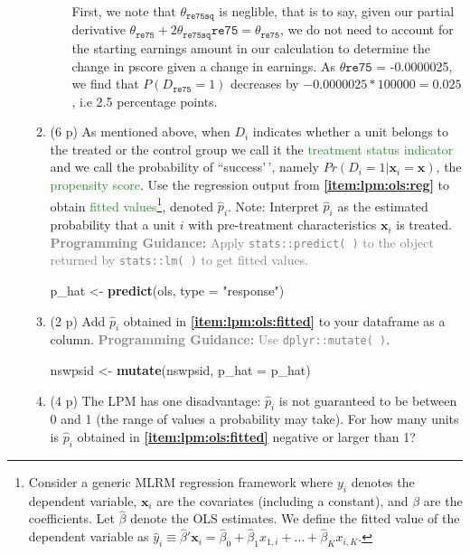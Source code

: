 \documentclass[
]{article}
\newenvironment{Shaded}{\begin{snugshade}}{\end{snugshade}}
\newcommand{\AttributeTok}[1]{\textcolor[rgb]{0.13,0.29,0.53}{#1}}
\newcommand{\FunctionTok}[1]{\textcolor[rgb]{0.13,0.29,0.53}{\textbf{#1}}}
\newcommand{\NormalTok}[1]{#1}
\newcommand{\OtherTok}[1]{\textcolor[rgb]{0.56,0.35,0.01}{#1}}
\newcommand{\StringTok}[1]{\textcolor[rgb]{0.31,0.60,0.02}{#1}}
\begin{document}
\begin{enumerate}
\begin{enumerate}
\begin{enumerate}
      First, we note that \(\theta_{\texttt{re75sq}}\) is neglible, that
      is to say, given our partial derivative
      \(\theta_{\texttt{re75}} + 2\theta_{\texttt{re75sq}}\texttt{re75} = \theta_{\texttt{re75}}\),
      we do not need to account for the starting earnings amount in our
      calculation to determine the change in pscore given a change in
      earnings. As \(\theta{\texttt{re75}}\) = -0.0000025, we find that
      \(P(D_\texttt{re75}=1)\) decreases by
      \(-0.0000025 * 100000 = 0.025\), i.e 2.5 percentage points.
    \end{enumerate}
  \item
    (6 p) As mentioned above, when \(D_i\) indicates whether a unit
    belongs to the treated or the control group we call it the
    \textcolor{ForestGreen}{treatment status indicator} and we call the
    probability of ``success'\,', namely
    \(Pr(D_i=1|\mathbf{x}_i=\mathbf{x})\), the
    \textcolor{ForestGreen}{propensity score}. Use the regression output
    from \textbf{\ref{item:lpm:ols:reg}} to obtain
    \textcolor{ForestGreen}{fitted values}\footnote{Consider a generic MLRM regression framework where $y_i$ denotes the dependent variable, $\mathbf{x}_i$ are the covariates (including a constant), and $\beta$ are the coefficients. Let $\hat{\beta}$ denote the OLS estimates. We define the fitted value of the dependent variable as $\hat{y}_i \equiv \hat{\beta}'\mathbf{x}_i = \hat{\beta}_0 + \hat{\beta}_1 x_{1,i}+\ldots+\hat{\beta}_K x_{i,K}$.},
    denoted \(\hat{p}_i\). Note: Interpret \(\hat{p}_i\) as the
    estimated probability that a unit \(i\) with pre-treatment
    characteristics \(\mathbf{x}_i\) is treated.
    \textcolor{gray}{\textbf{Programming Guidance:} Apply \texttt{stats::predict( )} to the object returned by \texttt{stats::lm( )} to get fitted values.}\label{item:lpm:ols:fitted}

\begin{Shaded}
\begin{Highlighting}[]
\NormalTok{p\_hat }\OtherTok{\textless{}{-}} \FunctionTok{predict}\NormalTok{(ols, }\AttributeTok{type =} \StringTok{"response"}\NormalTok{)}
\end{Highlighting}
\end{Shaded}
  \item
    (2 p) Add \(\hat{p}_i\) obtained in
    \textbf{\ref{item:lpm:ols:fitted}} to your dataframe as a column.
    \textcolor{gray}{\textbf{Programming Guidance:} Use \texttt{dplyr::mutate( )}}.

\begin{Shaded}
\begin{Highlighting}[]
\NormalTok{nswpsid }\OtherTok{\textless{}{-}} \FunctionTok{mutate}\NormalTok{(nswpsid, }\AttributeTok{p\_hat =}\NormalTok{ p\_hat)}
\end{Highlighting}
\end{Shaded}
  \item
    (4 p) The LPM has one disadvantage: \(\hat{p}_i\) is not guaranteed
    to be between 0 and 1 (the range of values a probability may take).
    For how many units is \(\hat{p}_i\) obtained in
    \textbf{\ref{item:lpm:ols:fitted}} negative or larger than 1?


\end{enumerate}
\end{enumerate}
\end{document}
